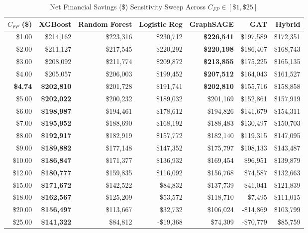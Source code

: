 \documentclass[11pt,a4paper]{report}
\begin{document}
\begin{table}[H]
\centering
\caption{Net Financial Savings (\$) Sensitivity Sweep Across $C_{FP} \in [\$1, \$25]$}
\label{tab:full_cost_sweep}
\small
\begin{tabular}{rrrrrrr}
\toprule
$C_{FP}$ \textbf{(\$)} & \textbf{XGBoost} & \textbf{Random Forest} & \textbf{Logistic Reg} & \textbf{GraphSAGE} & \textbf{GAT} & \textbf{Hybrid} \\
\midrule
\$1.00 & \$214,162 & \$223,316 & \$230,712 & \textbf{\$226,541} & \$197,589 & \$172,351 \\
\$2.00 & \$211,127 & \$217,545 & \$220,292 & \textbf{\$220,198} & \$186,407 & \$168,743 \\
\$3.00 & \$208,092 & \$211,774 & \$209,872 & \textbf{\$213,855} & \$175,225 & \$165,135 \\
\$4.00 & \$205,057 & \$206,003 & \$199,452 & \textbf{\$207,512} & \$164,043 & \$161,527 \\
\rowcolor{highlightgray}
\textbf{\$4.74} & \textbf{\$202,810} & \$201,728 & \$191,741 & \textbf{\$202,810} & \$155,716 & \$158,858 \\
\$5.00 & \textbf{\$202,022} & \$200,232 & \$189,032 & \$201,169 & \$152,861 & \$157,919 \\
\$6.00 & \textbf{\$198,987} & \$194,461 & \$178,612 & \$194,826 & \$141,679 & \$154,311 \\
\$7.00 & \textbf{\$195,952} & \$188,690 & \$168,192 & \$188,483 & \$130,497 & \$150,703 \\
\$8.00 & \textbf{\$192,917} & \$182,919 & \$157,772 & \$182,140 & \$119,315 & \$147,095 \\
\$9.00 & \textbf{\$189,882} & \$177,148 & \$147,352 & \$175,797 & \$108,133 & \$143,487 \\
\$10.00 & \textbf{\$186,847} & \$171,377 & \$136,932 & \$169,454 & \$96,951 & \$139,879 \\
\$12.00 & \textbf{\$180,777} & \$159,835 & \$116,092 & \$156,768 & \$74,587 & \$132,663 \\
\$15.00 & \textbf{\$171,672} & \$142,522 & \$84,832 & \$137,739 & \$41,041 & \$121,839 \\
\$18.00 & \textbf{\$162,567} & \$125,209 & \$53,572 & \$118,710 & \$7,495 & \$111,015 \\
\$20.00 & \textbf{\$156,497} & \$113,667 & \$32,732 & \$106,024 & -\$14,869 & \$103,799 \\
\$25.00 & \textbf{\$141,322} & \$84,812 & -\$19,368 & \$74,309 & -\$70,779 & \$85,759 \\
\bottomrule
\end{tabular}
\end{table}
\end{document}
